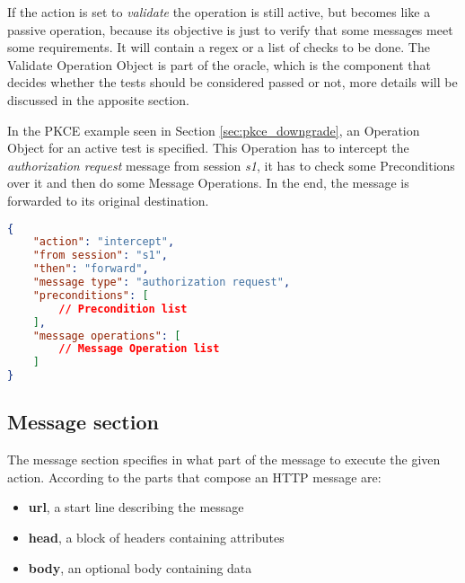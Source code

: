 If the action is set to \textit{validate} the operation is still active, but becomes like a passive operation, because its objective is just to verify that some messages meet some requirements. It will contain a regex or a list of checks to be done. The Validate Operation Object is part of the oracle, which is the component that decides whether the tests should be considered passed or not, more details will be discussed in the apposite section.

In the \gls{PKCE} example seen in Section \ref{sec:pkce_downgrade}, an Operation Object for an active test is specified. This Operation has to intercept the \textit{authorization request} message from session \textit{s1}, it has to check some Preconditions over it and then do some Message Operations. In the end, the message is forwarded to its original destination.

\begin{lstlisting}[language=json, caption=Operation definition]
{
    "action": "intercept",
    "from session": "s1",
    "then": "forward",
    "message type": "authorization request",
    "preconditions": [
        // Precondition list
    ],
    "message operations": [
        // Message Operation list
    ]
}
\end{lstlisting}

\subsection{Message section}
The message section specifies in what part of the message to execute the given action.
According to \cite{http} the parts that compose an HTTP message are:
\begin{itemize}
    \item \textbf{url}, a start line describing the message
    \item \textbf{head}, a block of headers containing attributes
    \item \textbf{body}, an optional body containing data
\end{itemize}

